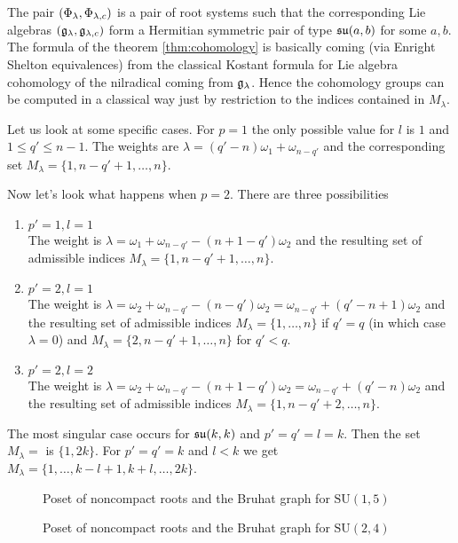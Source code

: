 The pair $(\Phi_\lambda,\Phi_{\lambda,c})$ is a pair of root systems such that the corresponding Lie algebras $(\mathfrak{g}_\lambda,\mathfrak{g}_{\lambda,c})$ form a Hermitian symmetric pair of type $\mathfrak{su}(a,b)$ for some $a,b$. The formula of the theorem \ref{thm:cohomology} is basically coming (via Enright Shelton equivalences) from the classical Kostant formula for Lie algebra cohomology of the nilradical coming from $\mathfrak{g}_\lambda$. Hence the cohomology groups can be computed in a classical way just by restriction to the indices contained in $M_\lambda$.

Let us look at some specific cases. For $p=1$ the only possible value for $l$ is $1$ and $1\leq q' \leq n-1$. The weights are $\lambda = (q'-n)\omega_1 + \omega_{n-q'}$ and the corresponding set $M_\lambda = \{ 1,n-q'+1,\ldots,n \}$.


Now let's look what happens when $p=2$. There are three possibilities
\begin{enumerate}
 \item $p'=1, l=1$\\
 The weight is $\lambda=\omega_1+\omega_{n-q'}-(n+1-q')\omega_2$ and the resulting set of admissible indices $M_\lambda = \{1,n-q'+1,\ldots,n\}$.
 \item $p'=2, l=1$\\
 The weight is $\lambda=\omega_2+\omega_{n-q'}-(n-q')\omega_2 = \omega_{n-q'} + (q'-n+1)\omega_2$ and the resulting set of admissible indices $M_\lambda = \{1,\ldots,n\}$ if $q'=q$ (in which case $\lambda = 0$) and $M_\lambda = \{2,n-q'+1,\ldots,n\}$ for $q'<q$.
 \item $p'=2, l=2$\\
 The weight is $\lambda=\omega_2+\omega_{n-q'}-(n+1-q')\omega_2 = \omega_{n-q'}+(q'-n)\omega_2$ and the resulting set of admissible indices $M_\lambda = \{1,n-q'+2,\ldots,n\}$.
\end{enumerate}

The most singular case occurs for $\mathfrak{su}(k,k)$ and $p'=q'=l = k $. Then the set $M_\lambda =$ is $\{1,2k\}$. For $p'=q'=k$ and $l<k$ we get $M_\lambda = \{ 1,\ldots,k-l+1,k+l,\ldots, 2k \}$.

\begin{figure}[h]
  \centering 
   
	 
  \caption{Poset of noncompact roots and the Bruhat graph for $\mathrm{SU}(1,5)$}
\end{figure} 

\begin{figure}[h]
  \centering 
   
	 
  \caption{Poset of noncompact roots and the Bruhat graph for $\mathrm{SU}(2,4)$}
\end{figure} 

